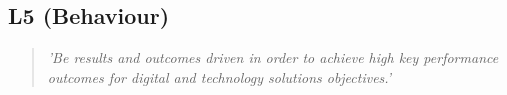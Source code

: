 \subsection{L5 (Behaviour)}

  \begin{quote}
    \textit{'Be results and outcomes driven in order
    to achieve high key performance outcomes for digital and
    technology solutions objectives.'}
  \end{quote}

\newpage